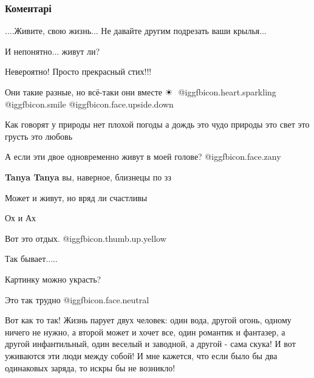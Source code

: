  
 
 
 
 
\subsubsection{Коментарі}

\begin{itemize} %
....Живите, свою жизнь... Не давайте другим подрезать ваши крылья...

И непонятно... живут ли?

Невероятно! Просто прекрасный стих!!!

Они такие разные, но всё-таки они вместе ☀ ️  @igg{fbicon.heart.sparkling}  @igg{fbicon.smile}  @igg{fbicon.face.upside.down} 


Как говорят у природы нет плохой погоды а дождь это чудо природы это свет это грусть это любовь

А если эти двое одновременно живут в моей голове?  @igg{fbicon.face.zany} 

\textbf{Tanya Tanya} вы, наверное, близнецы по зз

Может и живут, но вряд ли счастливы

Ох и Ах

Вот это отдых.  @igg{fbicon.thumb.up.yellow} 

Так бывает.....

Картинку можно украсть?

Это так трудно @igg{fbicon.face.neutral} 


Вот как то так! Жизнь парует двух человек: один вода, другой огонь, одному
ничего не нужно, а второй может и хочет все, один романтик и фантазер, а другой
инфантильный, один веселый и заводной, а другой - сама скука! И вот уживаются
эти люди между собой! И мне кажется, что если было бы два одинаковых заряда, то
искры бы не возникло!


\end{itemize}
